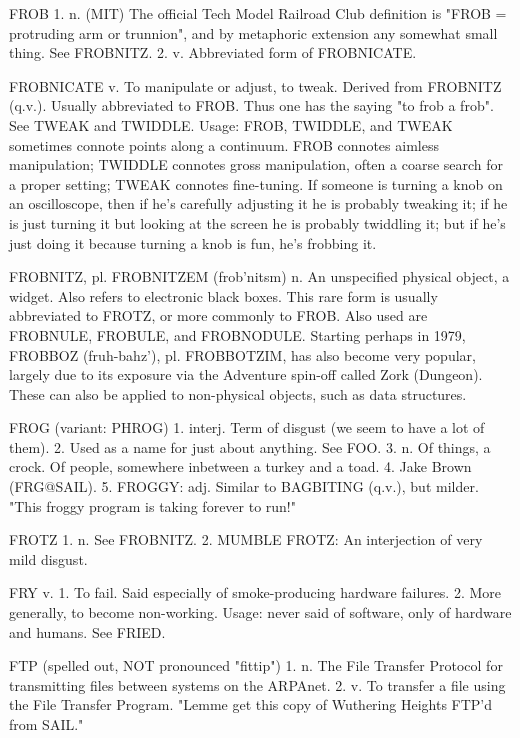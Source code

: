 FROB 1. n. (MIT) The official Tech Model Railroad Club definition is
   "FROB = protruding arm or trunnion", and by metaphoric extension
   any somewhat small thing.  See FROBNITZ.  2. v. Abbreviated form of
   FROBNICATE.

FROBNICATE v. To manipulate or adjust, to tweak.  Derived from
   FROBNITZ (q.v.).  Usually abbreviated to FROB.  Thus one has the
   saying "to frob a frob".  See TWEAK and TWIDDLE.  Usage: FROB,
   TWIDDLE, and TWEAK sometimes connote points along a continuum.
   FROB connotes aimless manipulation; TWIDDLE connotes gross
   manipulation, often a coarse search for a proper setting; TWEAK
   connotes fine-tuning.  If someone is turning a knob on an
   oscilloscope, then if he's carefully adjusting it he is probably
   tweaking it; if he is just turning it but looking at the screen he
   is probably twiddling it; but if he's just doing it because turning
   a knob is fun, he's frobbing it.

FROBNITZ, pl. FROBNITZEM (frob'nitsm) n. An unspecified physical
   object, a widget.  Also refers to electronic black boxes.  This
   rare form is usually abbreviated to FROTZ, or more commonly to
   FROB.  Also used are FROBNULE, FROBULE, and FROBNODULE.  Starting
   perhaps in 1979, FROBBOZ (fruh-bahz'), pl. FROBBOTZIM, has also
   become very popular, largely due to its exposure via the Adventure
   spin-off called Zork (Dungeon).  These can also be applied to
   non-physical objects, such as data structures.

FROG (variant: PHROG) 1. interj. Term of disgust (we seem to have a
   lot of them).  2. Used as a name for just about anything.  See FOO.
   3. n. Of things, a crock.  Of people, somewhere inbetween a turkey
   and a toad.	4. Jake Brown (FRG@SAIL).  5. FROGGY: adj. Similar to
   BAGBITING (q.v.), but milder.  "This froggy program is taking
   forever to run!"

FROTZ 1. n. See FROBNITZ.  2. MUMBLE FROTZ: An interjection of very
   mild disgust.

FRY v. 1. To fail.  Said especially of smoke-producing hardware
   failures.  2. More generally, to become non-working.	 Usage: never
   said of software, only of hardware and humans.  See FRIED.

FTP (spelled out, NOT pronounced "fittip") 1. n. The File Transfer
   Protocol for transmitting files between systems on the ARPAnet.  2.
   v. To transfer a file using the File Transfer Program.  "Lemme get
   this copy of Wuthering Heights FTP'd from SAIL."

